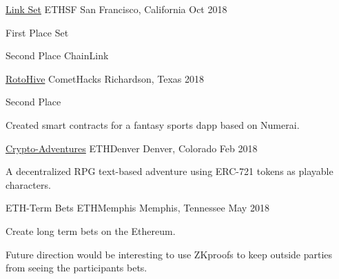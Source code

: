 

\begin{cventries}
  \cventry
    {\href{https://github.com/Emiller88/Link-Set}{Link Set}} %
    {ETHSF} %
    {San Francisco, California} %
    {Oct 2018} %
    {
      \begin{cvitems} %
        \item {First Place Set}
        \item {Second Place ChainLink}
      \end{cvitems}
    }
  \cventry
    {\href{https://github.com/Emiller88/Rotohive}{RotoHive}} %
    {CometHacks} %
    {Richardson, Texas} %
    {2018} %
    {
      \begin{cvitems} %
        \item {Second Place}
        \item {Created smart contracts for a fantasy sports dapp based on Numerai.}
      \end{cvitems}
    }

  \cventry
    {\href{https://github.com/Crypto-Adventures/}{Crypto-Adventures}} %
    {ETHDenver} %
    {Denver, Colorado} %
    {Feb 2018} %
    {
      \begin{cvitems} %
        \item {A decentralized RPG text-based adventure using ERC-721 tokens as playable characters.}
      \end{cvitems}
    }

  \cventry
    {ETH-Term Bets} %
    {ETHMemphis} %
    {Memphis, Tennessee} %
    {May 2018} %
    {
      \begin{cvitems} %
        \item {Create long term bets on the Ethereum.}
        \item {Future direction would be interesting to use ZKproofs to keep outside parties from seeing the participants bets.}
      \end{cvitems}
    }
\end{cventries}
